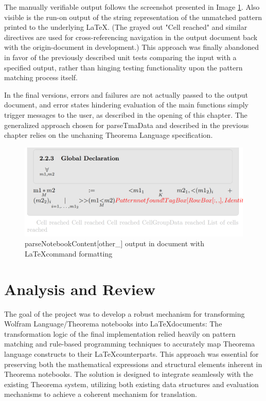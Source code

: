 The manually verifiable output follows the screenshot presented in Image \ref{fig:parseNotebookContent[other_]-output}. Also visible is the run-on output of the string representation of the unmatched pattern printed to the underlying \LaTeX. (The grayed out "Cell reached" and similar directives are used for cross-referencing navigation in the output document back with the origin-document in development.) This approach was finally abandoned in favor of the previously described unit tests comparing the input with a specified output, rather than hinging testing functionality upon the pattern matching process itself.

In the final versions, errors and failures are not actually passed to the output document, and error states hindering evaluation of the main functions simply trigger messages to the user, as described in the opening of this chapter. The generalized approach chosen for parseTmaData and described in the previous chapter relies on the unchaning Theorema Language specification.

\begin{figure}[h]
    \centering
    \includegraphics[scale=0.5]{images/closing/Screenshot 2024-03-08 171539.png}
    \caption{parseNotebookContent[other\_] output in document with \LaTeX command formatting}
    \label{fig:parseNotebookContent[other_]-output}
\end{figure}
 
 
\section{Analysis and Review}

The goal of the project was to develop a robust mechanism for transforming Wolfram Language/Theorema notebooks into \LaTeX documents: The transformation logic of the final implementation relied heavily on pattern matching and rule-based programming techniques to accurately map Theorema language constructs to their \LaTeX counterparts. This approach was essential for preserving both the mathematical expressions and structural elements inherent in Theorema notebooks. The solution is designed to integrate seamlessly with the existing Theorema system, utilizing both existing data structures and evaluation mechanisms to achieve a coherent mechanism for translation.

